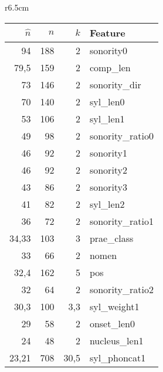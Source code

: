 \begin{wraptable}{r}{6.5cm}
\tiny
\centering
    \begin{tabular}{|rrr|l|}
    \hline
     $\hat{n}$ & $n$ & $k$ & Feature             \\ \hline
    94                     & 188                & 2                & sonority0        \\
    79,5                   & 159                & 2                & comp\_len        \\
    73                     & 146                & 2                & sonority\_dir    \\
    70                     & 140                & 2                & syl\_len0        \\
    53                     & 106                & 2                & syl\_len1        \\
    49                     & 98                 & 2                & sonority\_ratio0 \\
    46                     & 92                 & 2                & sonority1        \\
    46                     & 92                 & 2                & sonority2        \\
    43                     & 86                 & 2                & sonority3        \\
    41                     & 82                 & 2                & syl\_len2        \\
    36                     & 72                 & 2                & sonority\_ratio1 \\
    34,33                  & 103                & 3                & prae\_class      \\
    33                     & 66                 & 2                & nomen            \\
    32,4                   & 162                & 5                & pos              \\
    32                     & 64                 & 2                & sonority\_ratio2 \\
    30,3                   & 100                & 3,3              & syl\_weight1     \\
    29                     & 58                 & 2                & onset\_len0      \\
    24                     & 48                 & 2                & nucleus\_len1    \\
    23,21                  & 708                & 30,5             & syl\_phoncat1    \\

\end{tabular}
\end{wraptable}
